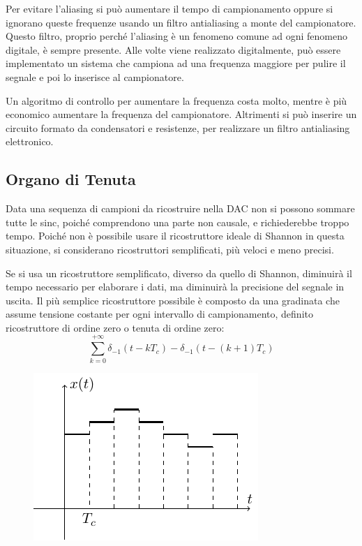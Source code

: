 \documentclass{article}
\numberwithin{equation}{subsection}
\begin{document}
Per evitare l'aliasing si può aumentare il tempo di campionamento oppure si ignorano queste frequenze usando un filtro antialiasing a monte del campionatore. 
Questo filtro, proprio perché l'aliasing è un fenomeno comune 
ad ogni fenomeno digitale, è sempre presente. Alle volte viene realizzato digitalmente, può essere implementato un sistema che campiona ad una frequenza maggiore per pulire 
il segnale e poi lo inserisce al campionatore. 

Un algoritmo di controllo per aumentare la frequenza costa molto, mentre è più economico aumentare la frequenza del campionatore. Altrimenti si può inserire un circuito formato 
da condensatori e resistenze, per realizzare un filtro antialiasing elettronico. 

\subsection{Organo di Tenuta}

Data una sequenza di campioni da ricostruire nella DAC non si possono sommare tutte le sinc, poiché comprendono una parte non causale, e richiederebbe troppo tempo. 
Poiché non è possibile usare il ricostruttore ideale di Shannon in questa situazione, si considerano ricostruttori semplificati, più veloci e meno precisi. 

Se si usa un ricostruttore semplificato, diverso da quello di Shannon, diminuirà il tempo necessario per elaborare 
i dati, ma diminuirà la precisione del segnale in uscita. Il più semplice ricostruttore possibile è composto 
da una gradinata che assume tensione costante per ogni intervallo di campionamento, definito ricostruttore di ordine zero o tenuta di ordine zero:
\begin{equation}
    \displaystyle\sum_{k=0}^{+\infty}\delta_{-1}(t-kT_c)-\delta_{-1}(t-(k+1)T_c)
\end{equation} 

\begin{figure}[H]%
    \centering
    \includegraphics{tenuta-0.pdf}%
\end{figure}
\end{document}
